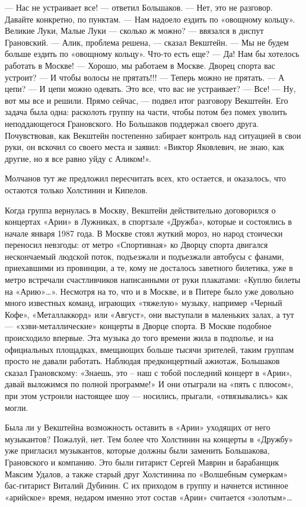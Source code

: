 \documentclass[10pt, twoside]{book}
\begin{document}
— Нас не устраивает все! — ответил Большаков.
— Нет, это не разговор. Давайте конкретно, по пунктам.
— Нам надоело ездить по «овощному кольцу». Великие Луки, Малые Луки — сколько ж можно? — ввязался в диспут Грановский.
— Алик, проблема решена, — сказал Векштейн. — Мы не будем больше ездить по «овощному кольцу». Что-то есть еще?
— Да! Нам бы хотелось работать в Москве!
— Хорошо, мы работаем в Москве. Дворец спорта вас устроит?
— И чтобы волосы не прятать!!!
— Теперь можно не прятать.
— А цепи?
— И цепи можно одевать. Это все, что вас не устраивает?
— Все!
— Ну, вот мы все и решили. Прямо сейчас, — подвел итог разговору Векштейн. Его задача была одна: расколоть группу на
части, чтобы потом без помех уволить неподдающегося Грановского. Но Большаков поддержал своего друга. Почувствовав, как
Векштейн постепенно забирает контроль над ситуацией в свои руки, он вскочил со своего места и заявил: «Виктор Яковлевич,
не знаю, как другие, но я все равно уйду с Аликом!».

Молчанов тут же предложил пересчитать всех, кто остается, и оказалось, что остаются только Холстинин и Кипелов.

Когда группа вернулась в Москву, Векштейн действительно договорился о концертах «Арии» в Лужниках, в спортзале «Дружба»,
которые и состоялись в начале января 1987 года. В Москве стоял жуткий мороз, но народ стоически переносил невзгоды: от
метро «Спортивная» ко Дворцу спорта двигался нескончаемый людской поток, подъезжали и подъезжали автобусы с фанами,
приехавшими из провинции, а те, кому не досталось заветного билетика, уже в метро встречали счастливчиков написанными от
руки плакатами: «Куплю билеты на «Арию»\ldots». Несмотря на то, что и в Москве, и в Питере было уже довольно много
известных команд, играющих «тяжелую» музыку, например «Черный Кофе», «Металлаккорд» или «Август», они выступали в
маленьких залах, а тут — «хэви-металлические» концерты в Дворце спорта. В Москве подобное происходило впервые. Эта
музыка до того времени жила в подполье, и на официальных площадках, вмещающих больше тысячи зрителей, таким группам
просто не давали работать. Наблюдая предконцертный ажиотаж, Большаков сказал Грановскому: «Знаешь, это – наш с тобой
последний концерт в «Арии», давай выложимся по полной программе!» И они отыграли на «пять с плюсом», при этом устроили
настоящее шоу — носились, прыгали, «отвязывались» как могли.

Была ли у Векштейна возможность оставить в «Арии» уходящих от него музыкантов? Пожалуй, нет. Тем более что Холстинин на
концерты в «Дружбу» уже пригласил музыкантов, которые должны были заменить Большакова, Грановского и компанию. Это были
гитарист Сергей Маврин и барабанщик Максим Удалов, а также старый друг Холстинина по «Волшебным сумеркам» бас-гитарист
Виталий Дубинин. С их приходом в группу и начнется истинное «арийское» время, недаром именно этот состав «Арии»
считается «золотым»\ldots
\end{document}
